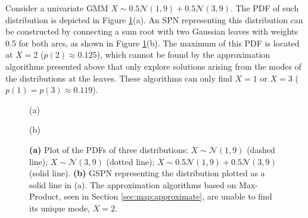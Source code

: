 \begin{example}
  Consider a univariate GMM $X \sim 0.5 \mathcal{N}(1, 9) + 0.5 \mathcal{N}(3, 9)$. The PDF of such distribution is depicted in Figure \ref{fig:shortcomings}(a). An SPN representing this distribution can be constructed by connecting a sum root with two Gaussian leaves with weights 0.5 for both arcs, as shown in Figure \ref{fig:shortcomings}(b). The maximum of this PDF is located at $X = 2$ ($p(2) \approx 0.125$), which cannot be found by the approximation algorithms presented above that only explore solutions arising from the modes of the distributions at the leaves. These algorithms can only find $X = 1$ or $X = 3$ ($p(1) = p(3) \approx 0.119$).
\end{example}

\begin{figure}
  \begin{minipage}{0.5\textwidth}
    \centering

    (a)
  \end{minipage}\begin{minipage}{0.5\textwidth}
    \centering

    (b)
  \end{minipage}

  \caption[Univariate GSPN in which Max-Product can not find MAP]{
    \textbf{(a)} Plot of the PDFs of three distributions: $X \sim \mathcal{N}(1, 9)$ (dashed line); $X \sim \mathcal{N}(3, 9)$ (dotted line); $X \sim 0.5 \mathcal{N}(1, 9) + 0.5 \mathcal{N}(3, 9)$ (solid line).
    \textbf{(b)} GSPN representing the distribution plotted as a solid line in (a). The approximation algorithms based on Max-Product, seen in Section \ref{sec:map:approximate}, are unable to find its unique mode, $X = 2$.
  }
  \label{fig:shortcomings}
\end{figure}

